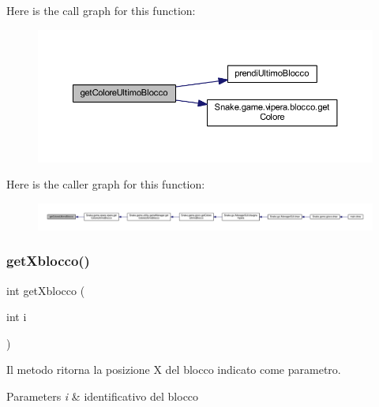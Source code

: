 Here is the call graph for this function\+:
\nopagebreak
\begin{figure}[H]
\begin{center}
\leavevmode
\includegraphics[width=350pt]{class_snake_1_1game_1_1vipera_1_1blocchi_a1afbc9b85396f53e6180eab2e5a36d4d_cgraph}
\end{center}
\end{figure}
Here is the caller graph for this function\+:
\nopagebreak
\begin{figure}[H]
\begin{center}
\leavevmode
\includegraphics[width=350pt]{class_snake_1_1game_1_1vipera_1_1blocchi_a1afbc9b85396f53e6180eab2e5a36d4d_icgraph}
\end{center}
\end{figure}
\mbox{\label{class_snake_1_1game_1_1vipera_1_1blocchi_ac25c5b310cb26c05d5ea69485d1e155f}} 
\subsubsection{\texorpdfstring{get\+Xblocco()}{getXblocco()}}
{\footnotesize\ttfamily int get\+Xblocco (\begin{DoxyParamCaption}\item[{int}]{i }\end{DoxyParamCaption})}



Il metodo ritorna la posizione X del blocco indicato come parametro. 


\begin{DoxyParams}{Parameters}
{\em i} & identificativo del blocco \\
\hline
\end{DoxyParams}



